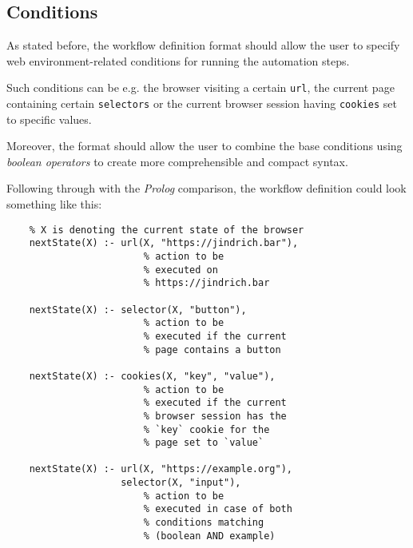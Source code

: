 
\subsection{Conditions}

As stated before, the workflow definition format should allow the user to specify web environment-related conditions for running the automation steps.

Such conditions can be e.g. the browser visiting a certain \texttt{url}, the current page containing certain \texttt{selectors} or the current browser session having \texttt{cookies} set to specific values.

Moreover, the format should allow the user to combine the base conditions using \textit{boolean operators} to create more comprehensible and compact syntax.

Following through with the \textit{Prolog} comparison, the workflow definition could look something like this:

\begin{minipage}{0.95\linewidth}
\begin{verbatim}
    % X is denoting the current state of the browser
    nextState(X) :- url(X, "https://jindrich.bar"),
                        % action to be 
                        % executed on 
                        % https://jindrich.bar
    
    nextState(X) :- selector(X, "button"),
                        % action to be 
                        % executed if the current 
                        % page contains a button
    
    nextState(X) :- cookies(X, "key", "value"),
                        % action to be 
                        % executed if the current 
                        % browser session has the
                        % `key` cookie for the  
                        % page set to `value`
    
    nextState(X) :- url(X, "https://example.org"),
                    selector(X, "input"),
                        % action to be 
                        % executed in case of both
                        % conditions matching 
                        % (boolean AND example)
\end{verbatim}
\end{minipage}

